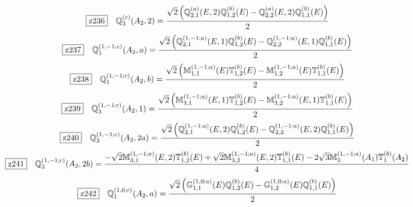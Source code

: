 \documentclass[fleqn,10pt,landscape]{jsarticle}
\begin{document}
\begin{dmath*}
\hspace*{3mm}\fbox{z236}\quad \mathbb{Q}_{3}^{(c)}(A_{2},2)=\frac{\sqrt{2} \left(\mathbb{Q}_{2,1}^{(a)}(E,2) \mathbb{Q}_{1,2}^{(b)}(E) - \mathbb{Q}_{2,2}^{(a)}(E,2) \mathbb{Q}_{1,1}^{(b)}(E)\right)}{2}
\end{dmath*}
\begin{dmath*}
\hspace*{3mm}\fbox{z237}\quad \mathbb{Q}_{1}^{(1,-1;c)}(A_{2},a)=\frac{\sqrt{2} \left(\mathbb{Q}_{2,1}^{(1,-1;a)}(E,1) \mathbb{Q}_{1,2}^{(b)}(E) - \mathbb{Q}_{2,2}^{(1,-1;a)}(E,1) \mathbb{Q}_{1,1}^{(b)}(E)\right)}{2}
\end{dmath*}
\begin{dmath*}
\hspace*{3mm}\fbox{z238}\quad \mathbb{Q}_{1}^{(1,-1;c)}(A_{2},b)=\frac{\sqrt{2} \left(\mathbb{M}_{1,1}^{(1,-1;a)}(E) \mathbb{T}_{1,2}^{(b)}(E) - \mathbb{M}_{1,2}^{(1,-1;a)}(E) \mathbb{T}_{1,1}^{(b)}(E)\right)}{2}
\end{dmath*}
\begin{dmath*}
\hspace*{3mm}\fbox{z239}\quad \mathbb{Q}_{3}^{(1,-1;c)}(A_{2},1)=\frac{\sqrt{2} \left(\mathbb{M}_{3,1}^{(1,-1;a)}(E,1) \mathbb{T}_{1,2}^{(b)}(E) - \mathbb{M}_{3,2}^{(1,-1;a)}(E,1) \mathbb{T}_{1,1}^{(b)}(E)\right)}{2}
\end{dmath*}
\begin{dmath*}
\hspace*{3mm}\fbox{z240}\quad \mathbb{Q}_{3}^{(1,-1;c)}(A_{2},2a)=\frac{\sqrt{2} \left(\mathbb{Q}_{2,1}^{(1,-1;a)}(E,2) \mathbb{Q}_{1,2}^{(b)}(E) - \mathbb{Q}_{2,2}^{(1,-1;a)}(E,2) \mathbb{Q}_{1,1}^{(b)}(E)\right)}{2}
\end{dmath*}
\begin{dmath*}
\hspace*{3mm}\fbox{z241}\quad \mathbb{Q}_{3}^{(1,-1;c)}(A_{2},2b)=\frac{- \sqrt{2} \mathbb{M}_{3,1}^{(1,-1;a)}(E,2) \mathbb{T}_{1,2}^{(b)}(E) + \sqrt{2} \mathbb{M}_{3,2}^{(1,-1;a)}(E,2) \mathbb{T}_{1,1}^{(b)}(E) - 2 \sqrt{3} \mathbb{M}_{3}^{(1,-1;a)}(A_{1}) \mathbb{T}_{1}^{(b)}(A_{2})}{4}
\end{dmath*}
\begin{dmath*}
\hspace*{3mm}\fbox{z242}\quad \mathbb{Q}_{1}^{(1,0;c)}(A_{2},a)=\frac{\sqrt{2} \left(\mathbb{G}_{1,1}^{(1,0;a)}(E) \mathbb{Q}_{1,2}^{(b)}(E) - \mathbb{G}_{1,2}^{(1,0;a)}(E) \mathbb{Q}_{1,1}^{(b)}(E)\right)}{2}
\end{dmath*}
\end{document}

